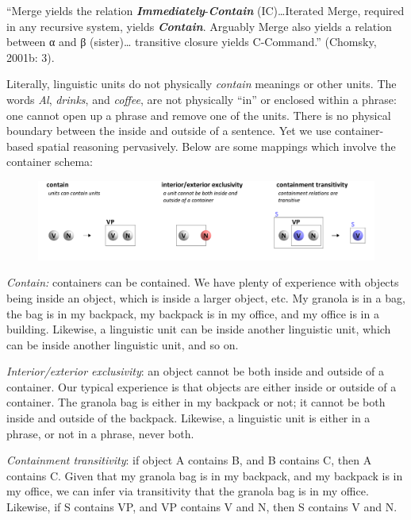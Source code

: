 “Merge yields the relation \textbf{\textit{Immediately}}{}-\textbf{\textit{Contain}} (IC)…Iterated Merge, required in any recursive system, yields \textbf{\textit{Contain}}. Arguably Merge also yields a relation between α and β (sister)… transitive closure yields C-Command.” (Chomsky, 2001b: 3).

  Literally, linguistic units do not physically \textit{contain} meanings or other units. The words \textit{Al}, \textit{drinks}, and \textit{coffee}, are not physically “in” or enclosed within a phrase: one cannot open up a phrase and remove one of the units. There is no physical boundary between the inside and outside of a sentence. Yet we use container-based spatial reasoning pervasively. Below are some mappings which involve the container schema:

  
\begin{figure}
\includegraphics[width=\textwidth]{figures/Tilsen-img32.png}
\caption{\missingcaption}
\label{fig:}
\end{figure}
 

\textit{Contain:} containers can be contained. We have plenty of experience with objects being inside an object, which is inside a larger object, etc. My granola is in a bag, the bag is in my backpack, my backpack is in my office, and my office is in a building. Likewise, a linguistic unit can be inside another linguistic unit, which can be inside another linguistic unit, and so on.

\textit{Interior/exterior exclusivity}: an object cannot be both inside and outside of a container. Our typical experience is that objects are either inside or outside of a container. The granola bag is either in my backpack or not; it cannot be both inside and outside of the backpack. Likewise, a linguistic unit is either in a phrase, or not in a phrase, never both.

\textit{Containment transitivity}: if object A contains B, and B contains C, then A contains C. Given that my granola bag is in my backpack, and my backpack is in my office, we can infer via transitivity that the granola bag is in my office. Likewise, if S contains VP, and VP contains V and N, then S contains V and N.

